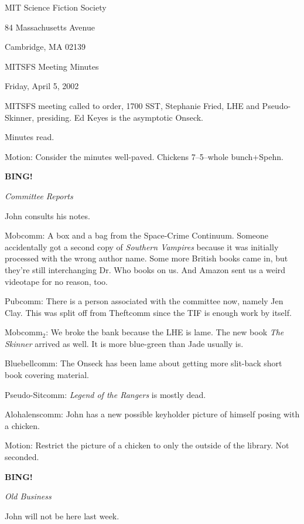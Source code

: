 \documentclass[12pt]{article}
\newcommand{\bing}{{\bf BING!} }
\newcommand{\goto}[1]{\bing \vskip 12pt \centerline{{\em{#1}}}}
\begin{document}
\begin{center}

MIT Science Fiction Society 

84 Massachusetts Avenue

Cambridge, MA 02139

\vspace{12pt}

MITSFS Meeting Minutes 

Friday, April 5, 2002

\end{center}
 
\vspace{18pt}

\setlength{\parskip}{6pt}

\noindent
MITSFS meeting called to order, 1700 SST, Stephanie Fried, LHE and
Pseudo-Skinner, presiding.  Ed Keyes is the asymptotic Onseck.

Minutes read.

Motion: Consider the minutes well-paved.  Chickens 7--5--whole bunch+Spehn.

\goto{Committee Reports}

John consults his notes.

Mobcomm: A box and a bag from the Space-Crime Continuum.  Someone
accidentally got a second copy of {\em Southern Vampires} because it
was initially processed with the wrong author name.  Some more British
books came in, but they're still interchanging Dr. Who books on us.
And Amazon sent us a weird videotape for no reason, too.

Pubcomm: There is a person associated with the committee now, namely
Jen Clay.  This was split off from Theftcomm since the TIF is enough
work by itself.

Mobcomm$_2$: We broke the bank because the LHE is lame.  The new book
{\em The Skinner} arrived as well.  It is more blue-green than Jade
usually is.

Bluebellcomm: The Onseck has been lame about getting more slit-back
short book covering material.

Pseudo-Sitcomm: {\em Legend of the Rangers} is mostly dead.

Alohalenscomm: John has a new possible keyholder picture of himself
posing with a chicken.

Motion: Restrict the picture of a chicken to only the outside of
the library.  Not seconded.

\goto{Old Business}

John will not be here last week.
\end{document}
